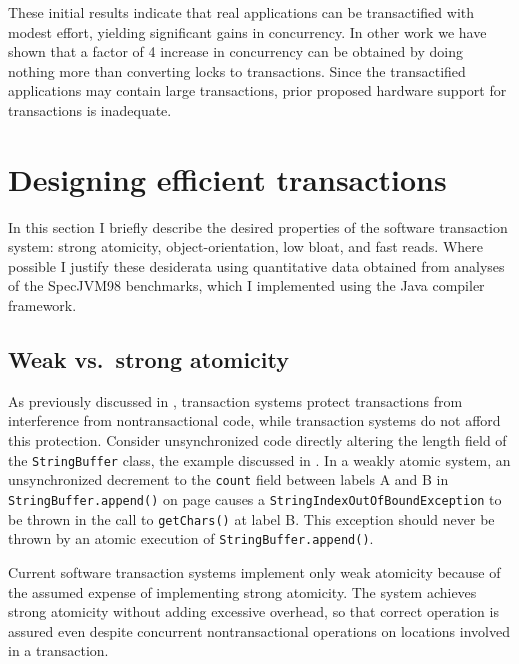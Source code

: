 \vspace*{5mm}

These initial results indicate that real applications can be
transactified with modest effort, yielding significant gains in
concurrency.  In other work \cite{AnanianAsKuLeLi05} we have shown
that a factor of 4 increase in concurrency can be obtained
by doing nothing more than converting locks to transactions.  Since
the transactified applications may contain large transactions, prior
proposed hardware support for transactions is inadequate.


\section{Designing efficient transactions}\label{sec:efficient}

In this section I briefly describe the desired properties of the
\apex software transaction system: strong atomicity,
object-orientation, low bloat, and fast reads.  Where possible I
justify these desiderata using quantitative data obtained from
analyses of the SpecJVM98 benchmarks, which I implemented using the
\flex Java compiler framework.

\subsection{Weak vs.\ strong atomicity}
As previously discussed in ,
transaction systems protect transactions from interference from
nontransactional code, while  transaction
systems do not afford this protection.
Consider unsynchronized code directly altering the length field of
the {\tt String\-Buffer} class, the example discussed in .
In a weakly atomic system, an unsynchronized decrement to the \texttt{count}
field between labels A and B in \texttt{StringBuffer.append()} on
page \pageref{pg:stringbuffer} causes a
\texttt{String\-Index\-Out\-Of\-Bound\-Exception} to be thrown in the call to
\texttt{getChars()} at label B.  This exception should never be thrown
by an atomic execution of {\tt String\-Buffer.append()}.

Current software transaction systems implement
only weak atomicity because of the assumed expense of implementing
strong atomicity.  The \apex system
achieves strong atomicity without adding excessive overhead, so that
correct operation is assured even despite concurrent nontransactional
operations on locations involved in a transaction.

